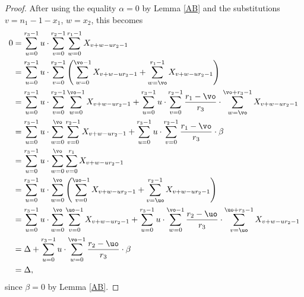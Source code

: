 \begin{proof}
After using the equality $\alpha=0$ by Lemma \ref{AB} and the substitutions $v=n_1-1-x_1$, %
$w=x_2$, this becomes
\begin{align*}
0&=\sum_{u=0}^{r_3-1}u\cdot \sum_{v=0}^{r_2-1}\sum _{w=0}^{r_1-1}X_{v+w-ur_2-1}\\
&=\sum_{u=0}^{r_3-1}u\cdot \sum_{v=0}^{r_2-1}\left(\sum _{w=0}^{\vo-1}X_{v+w-ur_2-1}+\sum _{w=\vo}^{r_1-1}X_{v+w-ur_2-1}\right)\\
&=\sum_{u=0}^{r_3-1}u\cdot \sum_{v=0}^{r_2-1}\sum _{w=0}^{\vo-1}X_{v+w-ur_2-1}+\sum_{u=0}^{r_3-1}u\cdot \sum_{v=0}^{r_2-1}\frac{r_1-\vo}{r_3}\cdot\sum _{w=\vo}^{\vo + r_3-1}X_{v+w-ur_2-1}\\
&=\sum_{u=0}^{r_3-1}u\cdot \sum _{w=0}^{\vo} \sum_{v=0}^{r_2-1} X_{v+w-ur_2-1}+\sum_{u=0}^{r_3-1}u\cdot \sum_{v=0}^{r_2-1}\frac{r_1-\vo}{r_3}\cdot \beta\\
&=\sum_{u=0}^{r_3-1}u\cdot \sum _{w=0}^{\vo} \sum_{v=0}^{r_1} X_{v+w-ur_2-1}\\
&=\sum_{u=0}^{r_3-1}u\cdot \sum _{w=0}^{\vo}\left( \sum_{v=0}^{\uo-1} X_{v+w-ur_2-1}+\sum_{v=\uo}^{r_2-1} X_{v+w-ur_2-1}\right)\\
&=\sum_{u=0}^{r_3-1}u\cdot \sum _{w=0}^{\vo} \sum_{v=0}^{\uo-1} X_{v+w-ur_2-1}+\sum_{u=0}^{r_3-1}u\cdot \sum _{w=0}^{\vo-1}\frac{r_2-\uo}{r_3}\cdot \sum_{v=\uo}^{\uo+r_3-1} X_{v+w-ur_2-1}\\
&=\Delta+\sum_{u=0}^{r_3-1}u\cdot \sum _{w=0}^{\vo-1}\frac{r_2-\uo}{r_3}\cdot \beta\\
&=\Delta,
\end{align*}
since $\beta=0$ by Lemma \ref{AB}.
\end{proof}

